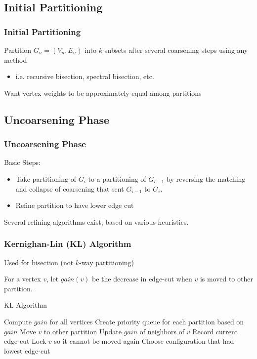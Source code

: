 \documentclass{beamer}
\begin{document}
\subsection{Initial Partitioning}

\begin{frame}
  \frametitle{Initial Partitioning}

  Partition $G_n=(V_n,E_n)$ into $k$ subsets after several coarsening steps using any method
  \begin{itemize}
    \item i.e. recursive bisection, spectral bisection, etc.
  \end{itemize}

  \vspace{1cm}

  Want vertex weights to be approximately equal among partitions

\end{frame}

\subsection{Uncoarsening Phase}

\begin{frame}
  \frametitle{Uncoarsening Phase}

  Basic Steps:
  \begin{itemize}
    \item Take partitioning of $G_i$ to a partitioning of $G_{i-1}$ by reversing the matching and collapse of coarsening that sent $G_{i-1}$ to $G_i$.
    \item Refine partition to have lower edge cut
  \end{itemize}

  Several refining algorithms exist, based on various heuristics.

\end{frame}

\begin{frame}
  \frametitle{Kernighan-Lin (KL) Algorithm}

  Used for bisection (not $k$-way partitioning)

  For a vertex $v$, let $gain(v)$ be the decrease in edge-cut when $v$ is moved to other partition.

  \begin{block}{KL Algorithm}
    \begin{algorithm}[H]
      \begin{algorithmic}[1]
        \STATE Compute $gain$ for all vertices
        \STATE Create priority queue for each partition based on $gain$
        \STATE Move $v$ to other partition
        \STATE Update $gain$ of neighbors of $v$
        \STATE Record current edge-cut
        \STATE Lock $v$ so it cannot be moved again
        \ENDFOR
        \STATE Choose configuration that had lowest edge-cut
      \end{algorithmic}
    \end{algorithm}
  \end{block}

\end{frame}
\end{document}

